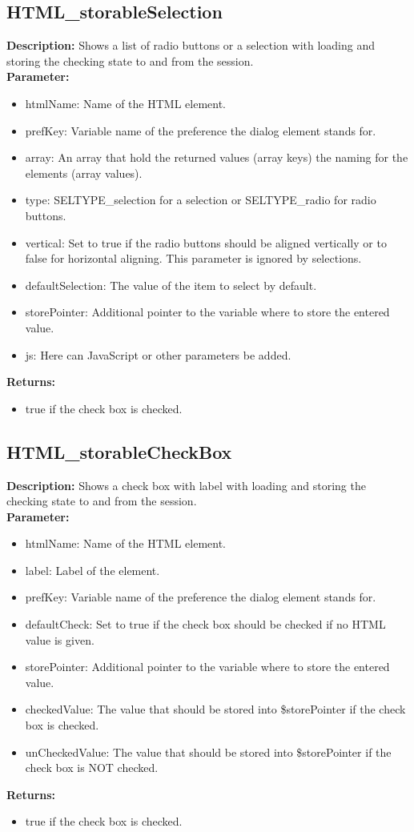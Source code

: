 \subsection{HTML\_storableSelection}
\textbf{Description:} Shows a list of radio buttons or a selection with loading and storing the checking state to and from the session.\\
\textbf{Parameter:}
\begin{itemize}
\item htmlName: Name of the HTML element.
\item prefKey: Variable name of the preference the dialog element stands for.
\item array: An array that hold the returned values (array keys) the naming for the elements (array values).
\item type: SELTYPE\_selection for a selection or SELTYPE\_radio for radio buttons.
\item vertical: Set to true if the radio buttons should be aligned vertically or to false for horizontal aligning. This parameter is ignored by selections.
\item defaultSelection: The value of the item to select by default.
\item storePointer: Additional pointer to the variable where to store the entered value.
\item js: Here can JavaScript or other parameters be added.
\end{itemize}
\textbf{Returns:}
\begin{itemize}
\item true if the check box is checked.
\end{itemize}

\subsection{HTML\_storableCheckBox}
\textbf{Description:} Shows a check box with label with loading and storing the checking state to and from the session.\\
\textbf{Parameter:}
\begin{itemize}
\item htmlName: Name of the HTML element.
\item label: Label of the element.
\item prefKey: Variable name of the preference the dialog element stands for.
\item defaultCheck: Set to true if the check box should be checked if no HTML value is given.
\item storePointer: Additional pointer to the variable where to store the entered value.
\item checkedValue: The value that should be stored into \$storePointer if the check box is checked.
\item unCheckedValue: The value that should be stored into \$storePointer if the check box is NOT checked.
\end{itemize}
\textbf{Returns:}
\begin{itemize}
\item true if the check box is checked.
\end{itemize}

